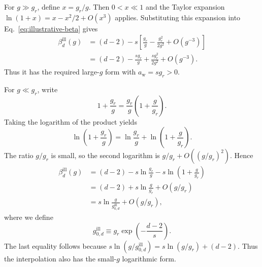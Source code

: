 \documentclass[11pt,a4paper]{article}
\numberwithin{equation}{section}
\begin{document}
For $g\gg g_r$, define $x=g_r/g$. Then $0<x\ll1$ and the Taylor expansion $\ln(1+x)=x-x^2/2+O(x^3)$ applies. Substituting this expansion into Eq.~\eqref{eq:illustrative-beta} gives
\begin{align}
    \beta_d^{\mathrm{ill}}(g)
    &=(d-2)-s\left[\frac{g_r}{g}-\frac{g_r^2}{2g^2}
      +O(g^{-3})\right]\\
    &=(d-2)-\frac{s g_r}{g}+\frac{s g_r^2}{2g^2}
      +O(g^{-3}).
\end{align}
Thus it has the required large-$g$ form with $a_{\mathrm{w}}=s g_r>0$.

For $g\ll g_r$, write
\begin{equation}
    1+\frac{g_r}{g}=\frac{g_r}{g}\left(1+\frac{g}{g_r}\right).
\end{equation}
Taking the logarithm of the product yields
\begin{equation}
    \ln\left(1+\frac{g_r}{g}\right)
    =\ln\frac{g_r}{g}+\ln\left(1+\frac{g}{g_r}\right).
\end{equation}
The ratio $g/g_r$ is small, so the second logarithm is $g/g_r+O((g/g_r)^2)$. Hence
\begin{align}
    \beta_d^{\mathrm{ill}}(g)
    &=(d-2)-s\ln\frac{g_r}{g}-s\ln\left(1+\frac{g}{g_r}\right)\\
    &=(d-2)+s\ln\frac{g}{g_r}+O(g/g_r)\\
    &=s\ln\frac{g}{g_{0,d}^{\mathrm{ill}}}+O(g/g_r),
\end{align}
where we define
\begin{equation}
    g_{0,d}^{\mathrm{ill}}\equiv g_r\exp\left(-\frac{d-2}{s}\right).
\end{equation}
The last equality follows because
$s\ln(g/g_{0,d}^{\mathrm{ill}})=s\ln(g/g_r)+(d-2)$. Thus the interpolation also has the small-$g$ logarithmic form.
\end{document}
